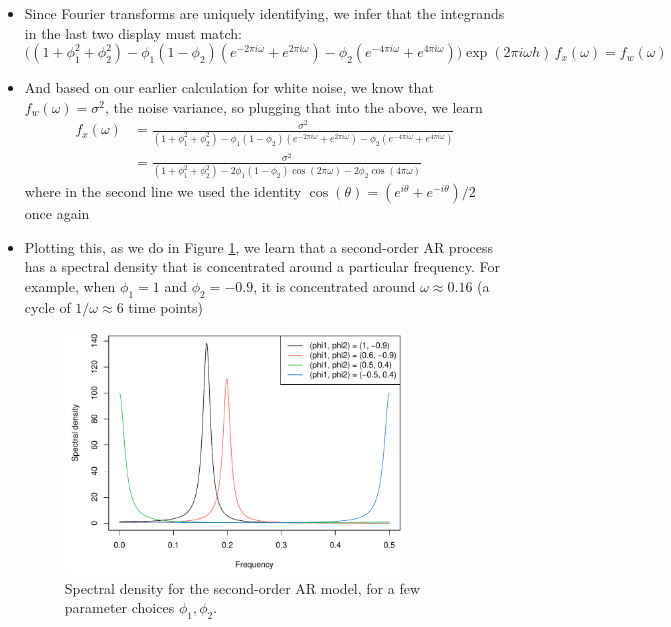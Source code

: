 \documentclass{article}
\begin{document}
\begin{itemize}
\item Since Fourier transforms are uniquely identifying, we infer that the
  integrands in the last two display must match:
  \[
  \Big( (1+\phi_1^2+\phi_2^2)  
    - \phi_1(1-\phi_2) (e^{-2\pi i \omega} + e^{2\pi i \omega})
    - \phi_2 (e^{-4\pi i \omega} + e^{4\pi i \omega}) \Big) \exp(2\pi i \omega
    h) \, f_x(\omega) = f_w(\omega)
  \]

\item And based on our earlier calculation for white noise, we know that
  $f_w(\omega) = \sigma^2$, the noise variance, so plugging that into the above,
  we learn 
  \begin{align*}
  f_x(\omega) &= \frac{\sigma^2}{ (1+\phi_1^2+\phi_2^2)  
    - \phi_1(1-\phi_2) (e^{-2\pi i \omega} + e^{2\pi i \omega})
    - \phi_2 (e^{-4\pi i \omega} + e^{4\pi i \omega}) } \\
  &= \frac{\sigma^2}{ (1+\phi_1^2+\phi_2^2)  
    -2 \phi_1(1-\phi_2) \cos(2\pi \omega) 
    - 2 \phi_2 \cos(4\pi \omega) }
  \end{align*}
  where in the second line we used the identity $\cos(\theta) = (e^{i\theta}
  +e^{-i\theta}) / 2$ once again

\item Plotting this, as we do in Figure \ref{fig:spectral_density_ar}, we learn
  that a second-order AR process has a spectral density that is concentrated
  around a particular frequency. For example, when $\phi_1 = 1$ and $\phi_2 = 
  -0.9$, it is concentrated around $\omega \approx 0.16$ (a cycle of $1/\omega
  \approx 6$ time points)

\begin{figure}[htb]
\centering
\includegraphics[width=0.85\textwidth]{fig/spectral-density-ar-1.pdf}
\caption{Spectral density for the second-order AR model, for a few parameter
  choices $\phi_1,\phi_2$.}
\label{fig:spectral_density_ar}
\end{figure}
\end{itemize}
\end{document}
